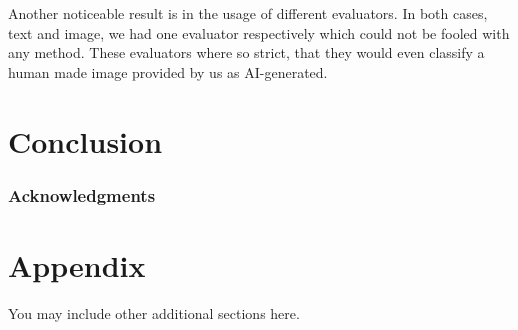 \documentclass{article} %
\begin{document}
Another noticeable result is in the usage of different evaluators. In both cases, text and image, we had one evaluator respectively which could not be fooled with any method. These evaluators where so strict, that they would even classify a human made image provided by us as AI-generated.

\section{Conclusion}


\subsubsection*{Acknowledgments}





\appendix
\section{Appendix}
You may include other additional sections here.
\end{document}
